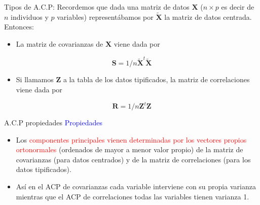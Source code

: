 \documentclass[
  ignorenonframetext,
]{beamer}
\providecommand{\tightlist}{%
  \setlength{\itemsep}{0pt}\setlength{\parskip}{0pt}}
\newcommand\blue[1]{\textcolor{blue}{#1}}
\newcommand\red[1]{\textcolor{red}{#1}}
\begin{document}
\begin{frame}{Tipos de A.C.P:}
\label{tipos-de-a.c.p-1}
Recordemos que dada una matriz de datos \(\mathbf{X}\) (\(n\times p\) es
decir de \(n\) individuos y \(p\) variables) representábamos por
\(\tilde{\mathbf{X}}\) la matriz de datos centrada. Entonces:

\begin{itemize}
\tightlist
\item
  La matriz de covarianzas de \(\mathbf{X}\) viene dada por
\end{itemize}

\[\mathbf{S}=1/n \tilde{\mathbf{X}}^t\tilde{\mathbf{X}}\]

\begin{itemize}
\tightlist
\item
  Si llamamos \(\mathbf{Z}\) a la tabla de los datos tipificados, la
  matriz de correlaciones viene dada por
\end{itemize}

\[\mathbf{R}=1/n \mathbf{Z}^t\mathbf{Z}\]
\end{frame}

\begin{frame}{A.C.P propiedades}
\label{a.c.p-propiedades}
\blue{Propiedades}

\begin{itemize}
\tightlist
\item
  Los
  \red{componentes principales vienen determinadas por los vectores propios ortonormales}
  (ordenados de mayor a menor valor propio) de la matriz de covarianzas
  (para datos centrados) y de la matriz de correlaciones (para los datos
  tipificados).
\item
  Así en el ACP de covarianzas cada variable interviene con su propia
  varianza mientras que el ACP de correlaciones todas las variables
  tienen varianza 1.
\end{itemize}
\end{frame}
\end{document}
